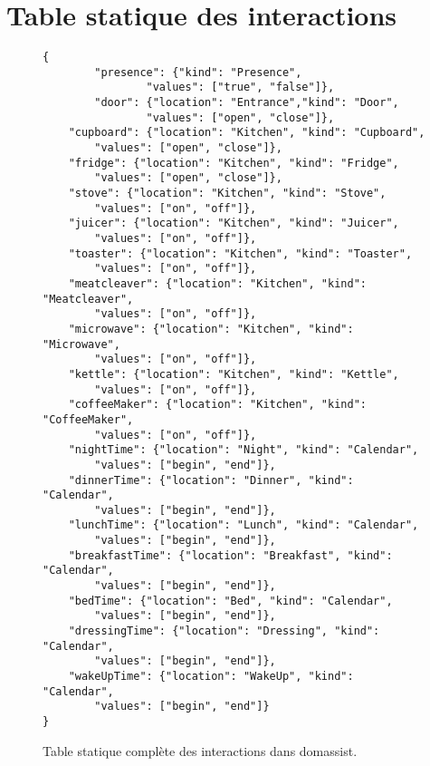 \chapter{Table statique des interactions}
\begin{figure}[h!]
\begin{lstlisting}[basicstyle=\ttfamily\footnotesize]
{       
        "presence": {"kind": "Presence",
                "values": ["true", "false"]},
        "door": {"location": "Entrance","kind": "Door",
                "values": ["open", "close"]},
	"cupboard": {"location": "Kitchen", "kind": "Cupboard",
		"values": ["open", "close"]},
	"fridge": {"location": "Kitchen", "kind": "Fridge",
		"values": ["open", "close"]}, 
	"stove": {"location": "Kitchen", "kind": "Stove",
		"values": ["on", "off"]},
	"juicer": {"location": "Kitchen", "kind": "Juicer",
		"values": ["on", "off"]},
	"toaster": {"location": "Kitchen", "kind": "Toaster",
		"values": ["on", "off"]},
	"meatcleaver": {"location": "Kitchen", "kind": "Meatcleaver",
		"values": ["on", "off"]},
	"microwave": {"location": "Kitchen", "kind": "Microwave",
		"values": ["on", "off"]},
	"kettle": {"location": "Kitchen", "kind": "Kettle",
		"values": ["on", "off"]},
	"coffeeMaker": {"location": "Kitchen", "kind": "CoffeeMaker",
		"values": ["on", "off"]},
	"nightTime": {"location": "Night", "kind": "Calendar",
		"values": ["begin", "end"]},
	"dinnerTime": {"location": "Dinner", "kind": "Calendar",
		"values": ["begin", "end"]},
	"lunchTime": {"location": "Lunch", "kind": "Calendar",
		"values": ["begin", "end"]},
	"breakfastTime": {"location": "Breakfast", "kind": "Calendar",
		"values": ["begin", "end"]},
	"bedTime": {"location": "Bed", "kind": "Calendar",
		"values": ["begin", "end"]},
	"dressingTime": {"location": "Dressing", "kind": "Calendar",
		"values": ["begin", "end"]},
	"wakeUpTime": {"location": "WakeUp", "kind": "Calendar",
		"values": ["begin", "end"]}
}
\end{lstlisting}
\caption{Table statique complète des interactions dans domassist.}
\label{listing:table_static_complete}
\end{figure}